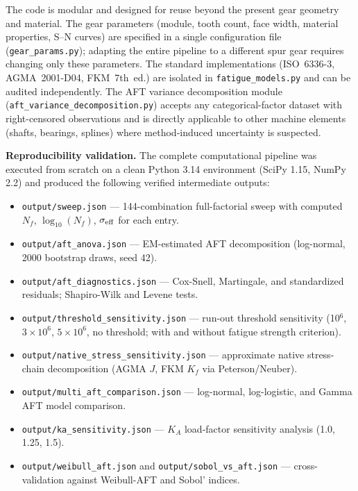 \documentclass[twocolumn,12pt,a4paper]{article}
\begin{document}
The code is modular and designed for reuse beyond the present gear
geometry and material. The gear parameters (module, tooth count, face
width, material properties, S--N curves) are specified in a single
configuration file (\texttt{gear\_params.py}); adapting the entire
pipeline to a different spur gear requires changing only these
parameters. The standard implementations (ISO~6336-3, AGMA~2001-D04,
FKM~7th~ed.) are isolated in \texttt{fatigue\_models.py} and can be
audited independently. The AFT variance decomposition module
(\texttt{aft\_variance\_decomposition.py}) accepts any
categorical-factor dataset with right-censored observations and is
directly applicable to other machine elements (shafts, bearings,
splines) where method-induced uncertainty is suspected.

\textbf{Reproducibility validation.} The complete computational
pipeline was executed from scratch on a clean Python 3.14 environment
(SciPy 1.15, NumPy 2.2) and produced the following verified
intermediate outputs:

\begin{itemize}
  \item \texttt{output/sweep.json} — 144-combination full-factorial
        sweep with computed $N_f$, $\log_{10}(N_f)$, $\sigma_{\rm
        eff}$ for each entry.
  \item \texttt{output/aft\_anova.json} — EM-estimated AFT
        decomposition (log-normal, 2000 bootstrap draws, seed 42).
  \item \texttt{output/aft\_diagnostics.json} — Cox-Snell, Martingale,
        and standardized residuals; Shapiro-Wilk and Levene tests.
  \item \texttt{output/\allowbreak threshold\_sensitivity\allowbreak .json} — run-out
        threshold sensitivity (10$^6$, $3\times10^6$, $5\times10^6$,
        no threshold; with and without fatigue strength criterion).
  \item \texttt{output/\allowbreak native\_stress\_sensitivity\allowbreak .json} —
        approximate native stress-chain decomposition (AGMA $J$,
        FKM $K_f$ via Peterson/Neuber).
  \item \texttt{output/multi\_aft\_comparison.json} — log-normal,
        log-logistic, and Gamma AFT model comparison.
  \item \texttt{output/ka\_sensitivity.json} — $K_A$ load-factor
        sensitivity analysis (1.0, 1.25, 1.5).
  \item \texttt{output/weibull\_aft.json} and
        \texttt{output/sobol\_vs\_aft.json} — cross-validation
        against Weibull-AFT and Sobol' indices.
\end{itemize}
\end{document}
